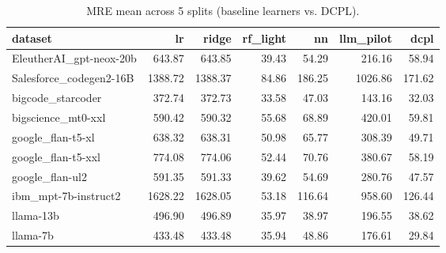 \begin{table}
\caption{MRE mean across 5 splits (baseline learners vs. DCPL).}
\label{tab:mre_mean_baseline_vs_dcpl}
\begin{tabular}{lrrrrrr}
\toprule
dataset & lr & ridge & rf\_light & nn & llm\_pilot & dcpl \\
\midrule
EleutherAI\_gpt-neox-20b & 643.87 & 643.85 & 39.43 & 54.29 & 216.16 & 58.94 \\
Salesforce\_codegen2-16B & 1388.72 & 1388.37 & 84.86 & 186.25 & 1026.86 & 171.62 \\
bigcode\_starcoder & 372.74 & 372.73 & 33.58 & 47.03 & 143.16 & 32.03 \\
bigscience\_mt0-xxl & 590.42 & 590.32 & 55.68 & 68.89 & 420.01 & 59.81 \\
google\_flan-t5-xl & 638.32 & 638.31 & 50.98 & 65.77 & 308.39 & 49.71 \\
google\_flan-t5-xxl & 774.08 & 774.06 & 52.44 & 70.76 & 380.67 & 58.19 \\
google\_flan-ul2 & 591.35 & 591.33 & 39.62 & 54.69 & 280.76 & 47.57 \\
ibm\_mpt-7b-instruct2 & 1628.22 & 1628.05 & 53.18 & 116.64 & 958.60 & 126.44 \\
llama-13b & 496.90 & 496.89 & 35.97 & 38.97 & 196.55 & 38.62 \\
llama-7b & 433.48 & 433.48 & 35.94 & 48.86 & 176.61 & 29.84 \\
\bottomrule
\end{tabular}
\end{table}
